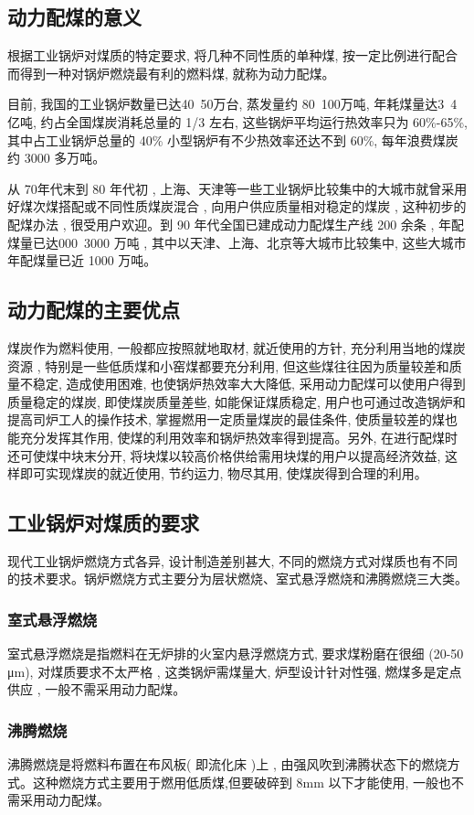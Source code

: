 \documentclass[10pt,openany]{ctexbook}
\begin{document}
\subsection{动力配煤的意义}
根据工业锅炉对煤质的特定要求, 将几种不同性质的单种煤, 按一定比例进行配合而得到一种对锅炉燃烧最有利的燃料煤, 就称为动力配煤。\par
    目前, 我国的工业锅炉数量已达40~50万台, 蒸发量约 80~100万吨, 年耗煤量达3~4 亿吨, 约占全国煤炭消耗总量的 1/3 左右, 这些锅炉平均运行热效率只为 60\%-65\%, 其中占工业锅炉总量的 40\% 小型锅炉有不少热效率还达不到 60\%, 每年浪费煤炭约 3000 多万吨。 \par
    从 70年代末到 80 年代初 , 上海、天津等一些工业锅炉比较集中的大城市就曾采用好煤次煤搭配或不同性质煤炭混合 , 向用户供应质量相对稳定的煤炭 , 这种初步的配煤办法 , 很受用户欢迎。到 90 年代全国已建成动力配煤生产线 200 余条 , 年配煤量已达000~3000 万吨 , 其中以天津、上海、北京等大城市比较集中, 这些大城市年配煤量已近 1000 万吨。
    \subsection{动力配煤的主要优点}
 煤炭作为燃料使用, 一般都应按照就地取材, 就近使用的方针, 充分利用当地的煤炭资源 , 特别是一些低质煤和小窑煤都要充分利用, 但这些煤往往因为质量较差和质量不稳定, 造成使用困难, 也使锅炉热效率大大降低, 采用动力配煤可以使用户得到质量稳定的煤炭, 即使煤炭质量差些, 如能保证煤质稳定, 用户也可通过改造锅炉和提高司炉工人的操作技术, 掌握燃用一定质量煤炭的最佳条件, 使质量较差的煤也能充分发挥其作用, 使煤的利用效率和锅炉热效率得到提高。另外, 在进行配煤时还可使煤中块末分开, 将块煤以较高价格供给需用块煤的用户以提高经济效益, 这样即可实现煤炭的就近使用, 节约运力, 物尽其用, 使煤炭得到合理的利用。
 \subsection{工业锅炉对煤质的要求}
   现代工业锅炉燃烧方式各异, 设计制造差别甚大, 不同的燃烧方式对煤质也有不同的技术要求。锅炉燃烧方式主要分为层状燃烧、室式悬浮燃烧和沸腾燃烧三大类。
\subsubsection{室式悬浮燃烧}
  室式悬浮燃烧是指燃料在无炉排的火室内悬浮燃烧方式, 要求煤粉磨在很细 (20-50 μm), 对煤质要求不太严格 , 这类锅炉需煤量大, 炉型设计针对性强, 燃煤多是定点供应 , 一般不需采用动力配煤。
\subsubsection{沸腾燃烧}
沸腾燃烧是将燃料布置在布风板( 即流化床 )上 , 由强风吹到沸腾状态下的燃烧方式。这种燃烧方式主要用于燃用低质煤,但要破碎到 8mm 以下才能使用, 一般也不需采用动力配煤。
\end{document}
